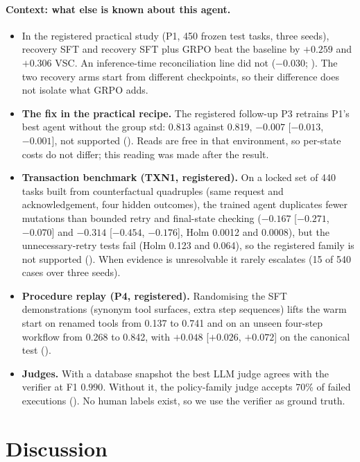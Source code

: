 \documentclass[11pt]{article}
\begin{document}
\paragraph{Context: what else is known about this agent.}
\begin{itemize}
\item In the registered practical study (P1, 450 frozen test tasks, three seeds), recovery SFT and recovery SFT plus
GRPO beat the baseline by $+0.259$ and $+0.306$ VSC. An inference-time reconciliation line did not ($-0.030$;
). The two recovery arms start from different checkpoints, so their difference does not isolate what GRPO adds.
\item \textbf{The fix in the practical recipe.} The registered follow-up P3 retrains P1's best agent without the
group std: $0.813$ against $0.819$, $-0.007$ [$-0.013$, $-0.001$], not supported ().
Reads are free in that environment, so per-state costs do not differ; this reading was made after the result.
\item \textbf{Transaction benchmark (TXN1, registered).} On a locked set of 440 tasks built from counterfactual
quadruples (same request and acknowledgement, four hidden outcomes), the trained agent duplicates fewer mutations
than bounded retry and final-state checking ($-0.167$ [$-0.271$, $-0.070$] and $-0.314$ [$-0.454$, $-0.176$], Holm
0.0012 and 0.0008), but the unnecessary-retry tests fail (Holm 0.123 and 0.064), so the registered family is not
supported (). When evidence is unresolvable it rarely escalates (15 of 540 cases over three seeds).
\item \textbf{Procedure replay (P4, registered).} Randomising the SFT demonstrations (synonym tool surfaces, extra
step sequences) lifts the warm start on renamed tools from 0.137 to 0.741 and on an unseen four-step workflow from
0.268 to 0.842, with $+0.048$ [$+0.026$, $+0.072$] on the canonical test ().
\item \textbf{Judges.} With a database snapshot the best LLM judge agrees with the verifier at F1 $0.990$. Without
it, the policy-family judge accepts 70\% of failed executions (). No human labels
exist, so we use the verifier as ground truth.
\end{itemize}

\section{Discussion}\label{sec:disc}
\end{document}

